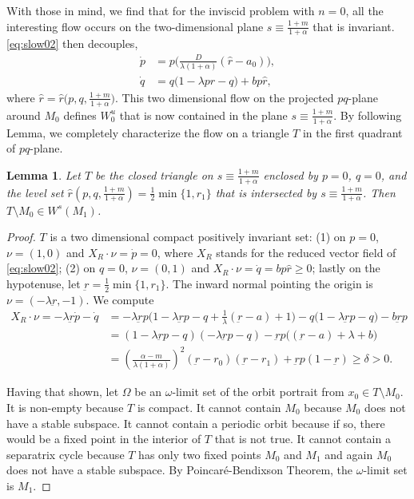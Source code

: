 \documentclass[a4paper,11pt]{article}
\newtheorem{lemma}{Lemma}[section]
\theoremstyle{remark}
\begin{document}
With those in mind, we find that for the inviscid problem with $n=0$, all the interesting flow occurs on the two-dimensional plane $s\equiv \frac{1+m}{1+\alpha}$ that is invariant. \eqref{eq:slow02} then decouples,
\begin{equation}\label{eq:slow03}
 \begin{aligned}
 \dot{p} &= p\Big(\frac{D}{\lambda(1+\alpha)}(\hat{r}-a_0)\Big),\\
 \dot{q} &= q\Big(1 -\lambda p \hat{r} -q\Big) + b p \hat{r}, 
 \end{aligned}
\end{equation}
where $\hat{r}=\hat{r}\big(p,q,\frac{1+m}{1+\alpha}\big)$. This two dimensional flow on the projected $pq$-plane around $M_0$ defines $W_0^u$ that is now contained in the plane $s\equiv \frac{1+m}{1+\alpha}$.
By following Lemma, we completely characterize the flow on a triangle $T$ in the first quadrant of $pq$-plane. 
\begin{lemma} \label{lem:T}
 Let $T$ be the closed triangle on $s\equiv \frac{1+m}{1+\alpha}$ enclosed by $p=0$, $q=0$, and the level set $\hat{r}(p,q,\frac{1+m}{1+\alpha})= \frac{1}{2}\min\{1,r_1\}$ that is intersected by $s\equiv \frac{1+m}{1+\alpha}$. 
 Then $T\setminus M_0 \in W^s(M_1)$.
\end{lemma}
\begin{proof}
$T$ is a two dimensional compact positively invariant set: (1) on $p=0$, $\nu = (1,0)$ and $X_R\cdot\nu = \dot{p}=0$, where $X_R$ stands for the reduced vector field of \eqref{eq:slow02};
 (2) on $q=0$, $\nu = (0,1)$ and $X_R\cdot\nu=\dot{q} = bp\hat{r}\ge0$; lastly on the hypotenuse, let $\underbar{r}=\frac{1}{2}\min\{1,r_1\}$. The inward normal pointing the origin is $\nu = (-\lambda\underbar{r}, -1)$. We compute
  \begin{align}
  X_R\cdot\nu=-\lambda\underbar{r}\dot{p} -\dot{q}&= -\lambda \underbar{r}p \Big(1-\lambda \underbar{r}p -q + \frac{1}{\lambda}(\underbar{r}-a)+1\Big) - q(1-\lambda \underbar{r}p -q\big) - b \underbar{r}p \nonumber\\
  &= (1-\lambda \underbar{r}p -q)(-\lambda \underbar{r}p -q) -\underbar{r}p\Big((\underbar{r}-a)+\lambda+b\Big)\nonumber\\
  &= \left(\frac{\alpha-m}{\lambda(1+\alpha)}\right)^2(\underbar{r}-r_0)(\underbar{r}-r_1)+\underbar{r}p(1-\underbar{r})\ge \delta>0. \label{eq:affine}
 \end{align}

Having that shown, let $\Omega$ be an $\omega$-limit set of the orbit portrait from $x_0\in T\setminus M_0$. It is non-empty because $T$ is compact. It cannot contain $M_0$ because $M_0$ does not have a stable subspace. It cannot contain a periodic orbit because if so, there would be a fixed point in the interior of $T$ that is not true. It cannot contain a separatrix cycle because $T$ has only two fixed points $M_0$ and $M_1$ and again $M_0$ does not have a stable subspace.  By Poincar\'e-Bendixson Theorem, the $\omega$-limit set is $M_1$.
\end{proof}
\end{document}
